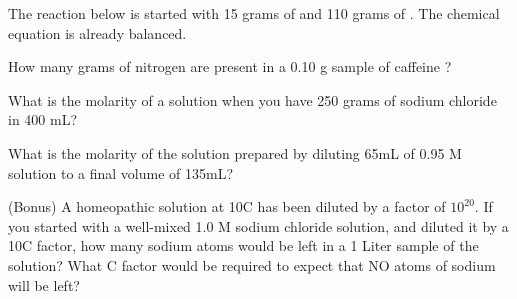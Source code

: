 \documentclass[addpoints, 12pt]{exam}
\begin{document}
\begin{questions}

\newpage

\question[10] The reaction below is started with 15 grams of  and
110 grams of .  The chemical equation is already balanced.

\vspace{5mm}


\question[10] How many grams of nitrogen are present in a 0.10 g
sample of caffeine ?
\vspace{2cm}

\question[10] What is the molarity of a solution when you have 250
grams of sodium chloride  in 400 mL?
\vspace{2cm}

\question[10] What is the molarity of the solution prepared by
diluting 65mL of 0.95 M  solution to a final volume of 135mL?
\vspace{2cm}

\newpage
\question[10] (Bonus) A homeopathic solution at 10C has been diluted
by a factor of $10^{20}$.  If you started with a well-mixed 1.0 M
sodium chloride  solution, and diluted it by a 10C factor,
how many sodium atoms would be left in a 1 Liter sample of the
solution?  What C factor would be required to expect that NO atoms of
sodium will be left?
\vspace{2cm}

\end{questions}
\end{document}
